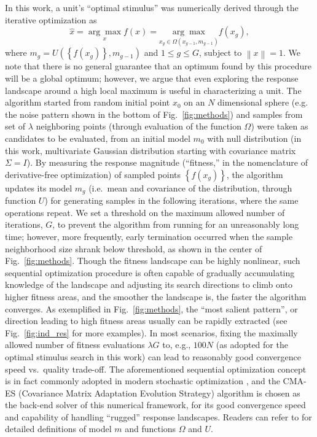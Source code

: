 In this work, a unit's ``optimal stimulus'' was numerically derived through the iterative optimization as \begin{equation} \label{eq:O1} \hat{x} = \underset{x} {\arg\max} f\left(x\right) = \underset{x_{g} \in \Omega \left( x_{g-1} , m_{g-1} \right)}{\arg\max} f\left(x_{g}\right),\end{equation} where $m_{g}=U\left(\left\lbrace f\left(x_{g}\right) \right\rbrace , m_{g-1}\right)$ and $1 \le g \le G$, subject to $\left\| x \right\| = 1$.  
We note that there is no general guarantee that an optimum found by this procedure will be a global optimum; however, we argue that even exploring the response landscape around a high local maximum is useful in characterizing a unit.
The algorithm started from random initial point $x_{0}$ on an $N$ dimensional sphere (e.g. the noise pattern shown in the bottom of Fig.~\ref{fig:methods}) and samples from set of $\lambda$ neighboring points (through evaluation of the function $\Omega$) were taken as candidates to be evaluated, from an initial model $m_{0}$ with null distribution (in this work, multivariate Gaussian distribution starting with covariance matrix $\Sigma = I$). 
By measuring the response magnitude (``fitness,'' in the nomenclature of derivative-free optimization) of sampled points $\left\lbrace f\left(x_{g}\right) \right\rbrace$, the algorithm updates its model $m_{g}$ (i.e.~mean and covariance of the distribution, through function $U$) for generating samples in the following iterations, where the same operations repeat.
We set a threshold on the maximum allowed number of iterations, $G$, to prevent the algorithm from running for an unreasonably long time; however, more frequently, early termination occurred when the sample neighborhood size shrank below threshold, as shown in the center of Fig.~\ref{fig:methods}. Though the fitness landscape can be highly nonlinear, such sequential optimization procedure is often capable of gradually accumulating knowledge of the landscape and adjusting its search directions to climb onto higher fitness areas, and the smoother the landscape is, the faster the algorithm converges. As exemplified in Fig.~\ref{fig:methods}, the ``most salient pattern'', or direction leading to high fitness areas usually can be rapidly extracted (see Fig.~\ref{fig:ind_res} for more examples). In most scenarios, fixing the maximally allowed number of fitness evaluations $\lambda G$ to, e.g., $100N$ (as adopted for the optimal stimulus search in this work) can lead to reasonably good convergence speed vs.~quality trade-off. The aforementioned sequential optimization concept is in fact commonly adopted in modern stochastic optimization \cite{spall2005introduction}, and the CMA-ES (Covariance Matrix Adaptation Evolution Strategy) algorithm \cite{hansen2001completely} is chosen as the back-end solver of this numerical framework, for its good convergence speed and capability of handling ``rugged'' response landscapes. Readers can refer to \cite{hansen2001completely} for detailed definitions of model $m$ and functions $\Omega$ and $U$.
